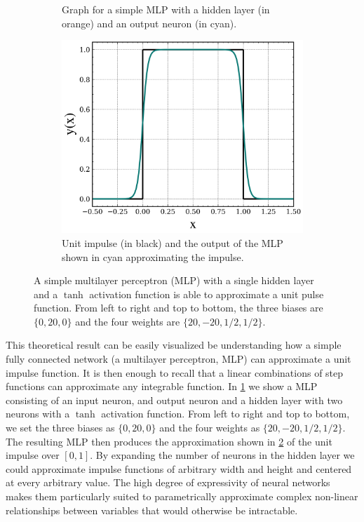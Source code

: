 \begin{figure}
\begin{subfigure}[b]{0.45\textwidth}
\begin{tikzpicture}[scale=0.2]
                    \end{tikzpicture}
        \caption{Graph for a simple MLP with a hidden layer (in orange) and an output neuron (in cyan).}
        \label{fig:MLP}
    \end{subfigure}
    \hfill
    \begin{subfigure}[b]{0.45\textwidth}
        \centering
        \includegraphics[width=1\textwidth]{img/ML/MLP_unit_impulse.png}
        \caption{Unit impulse (in black) and the output of the MLP shown in cyan approximating the impulse. }
        \label{fig:MLP_approx}
    \end{subfigure}
        \caption{A simple multilayer perceptron (MLP) with a single hidden layer and a $\tanh{}$ activation function is able to approximate a unit pulse function. From left to right and top to bottom, the three biases are $\{0, 20, 0\}$ and the four weights are $\{20, -20, 1/2, 1/2\}$.}
        \label{fig:ML MLP approx}
\end{figure}

This theoretical result can be easily visualized be understanding how a simple fully connected network (a multilayer perceptron, MLP) can approximate a unit impulse function. It is then enough to recall that a linear combinations of step functions can approximate any integrable function. In \cref{fig:MLP} we show a MLP consisting of an input neuron, and output neuron and a hidden layer with two neurons with a $\tanh{}$ activation function.
From left to right and top to bottom, we set the three biases as $\{0, 20, 0\}$ and the four weights as $\{20, -20, 1/2, 1/2\}$. The resulting MLP then produces the approximation shown in \cref{fig:MLP_approx} of the unit impulse over $[0,1]$. By expanding the number of neurons in the hidden layer we could approximate impulse functions of arbitrary width and height and centered at every arbitrary value. The high degree of expressivity of neural networks makes them particularly suited to parametrically approximate complex non-linear relationships between variables that would otherwise be intractable.

